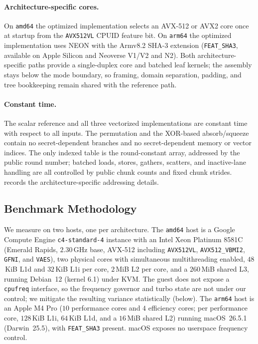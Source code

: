 \paragraph{Architecture-specific cores.}
On \texttt{amd64} the optimized implementation selects an AVX-512 or AVX2 core
once at startup from the \texttt{AVX512VL} CPUID feature bit. On \texttt{arm64}
the optimized implementation uses NEON with the Armv8.2 SHA-3 extension
(\texttt{FEAT\_SHA3}, available on Apple Silicon and Neoverse V1/V2 and N2).
Both architecture-specific paths provide a single-duplex core and batched leaf
kernels; the assembly stays below the mode boundary, so framing, domain
separation, padding, and tree bookkeeping remain shared with the reference path.

\paragraph{Constant time.}
The scalar reference and all three vectorized implementations are constant time
with respect to all inputs. The permutation and the XOR-based absorb/squeeze
contain no secret-dependent branches and no secret-dependent memory or vector
indices. The only indexed table is the round-constant array, addressed by the
public round number; batched loads, stores, gathers, scatters, and
inactive-lane handling are all controlled by public chunk counts and fixed
chunk strides.  records the architecture-specific addressing
details.

\subsection{Benchmark Methodology}
\label{sec:bench-method}

We measure on two hosts, one per architecture. The \texttt{amd64} host is a
Google Compute Engine \texttt{c4-standard-4} instance with an Intel Xeon Platinum
8581C (Emerald Rapids, $2.30$\,GHz base, AVX-512 including \texttt{AVX512VL},
\texttt{AVX512\_VBMI2}, \texttt{GFNI}, and \texttt{VAES}), two physical cores
with simultaneous multithreading enabled, $48$\,KiB L1d and $32$\,KiB L1i per
core, $2$\,MiB L2 per core, and a $260$\,MiB shared L3, running Debian~12 (kernel
6.1) under KVM. The guest does not expose a \texttt{cpufreq} interface, so the
frequency governor and turbo state are not under our control; we mitigate the
resulting variance statistically (below). The \texttt{arm64} host is an Apple M4
Pro ($10$ performance cores and $4$ efficiency cores; per performance core,
$128$\,KiB L1i, $64$\,KiB L1d, and a $16$\,MiB shared L2) running macOS~26.5.1
(Darwin~25.5), with \texttt{FEAT\_SHA3} present. macOS exposes no userspace
frequency control.

